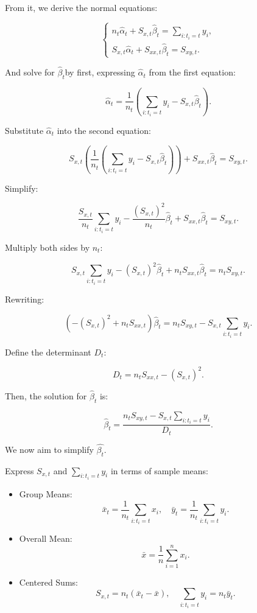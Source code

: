 \documentclass{article}
\begin{document}
From it, we derive the normal equations:

\[
\begin{cases}
n_t \hat{\alpha}_t + S_{x,t} \hat{\beta}_t = \sum_{i: t_i = t} y_i, \\
S_{x,t} \hat{\alpha}_t + S_{xx,t} \hat{\beta}_t = S_{xy,t}.
\end{cases}
\]

And solve for \(\hat{\beta}_t\)by first, expressing \(\hat{\alpha}_t\) from the first equation:

\[
\hat{\alpha}_t = \frac{1}{n_t} \left( \sum_{i: t_i = t} y_i - S_{x,t} \hat{\beta}_t \right).
\]

Substitute \(\hat{\alpha}_t\) into the second equation:

\[
S_{x,t} \left( \frac{1}{n_t} \left( \sum_{i: t_i = t} y_i - S_{x,t} \hat{\beta}_t \right) \right) + S_{xx,t} \hat{\beta}_t = S_{xy,t}.
\]

Simplify:

\[
\frac{S_{x,t}}{n_t} \sum_{i: t_i = t} y_i - \frac{(S_{x,t})^2}{n_t} \hat{\beta}_t + S_{xx,t} \hat{\beta}_t = S_{xy,t}.
\]

Multiply both sides by \(n_t\):

\[
S_{x,t} \sum_{i: t_i = t} y_i - (S_{x,t})^2 \hat{\beta}_t + n_t S_{xx,t} \hat{\beta}_t = n_t S_{xy,t}.
\]

Rewriting:

\[
\left( - (S_{x,t})^2 + n_t S_{xx,t} \right) \hat{\beta}_t = n_t S_{xy,t} - S_{x,t} \sum_{i: t_i = t} y_i.
\]

Define the determinant \(D_t\):

\[
D_t = n_t S_{xx,t} - (S_{x,t})^2.
\]

Then, the solution for \(\hat{\beta}_t\) is:

\[
\hat{\beta}_t = \frac{ n_t S_{xy,t} - S_{x,t} \sum_{i: t_i = t} y_i }{ D_t }.
\]

We now aim to simplify $\hat{\beta_t}$.

Express \(S_{x,t}\) and \(\sum_{i: t_i = t} y_i\) in terms of sample means:

\begin{itemize}
    \item Group Means:
    \[
    \bar{x}_t = \frac{1}{n_t} \sum_{i: t_i = t} x_i, \quad \bar{y}_t = \frac{1}{n_t} \sum_{i: t_i = t} y_i.
    \]
    \item Overall Mean:
    \[
    \bar{x} = \frac{1}{n} \sum_{i=1}^{n} x_i.
    \]
    \item Centered Sums:
    \[
    S_{x,t} = n_t (\bar{x}_t - \bar{x}), \quad \sum_{i: t_i = t} y_i = n_t \bar{y}_t.
    \]
\end{itemize}
\end{document}
